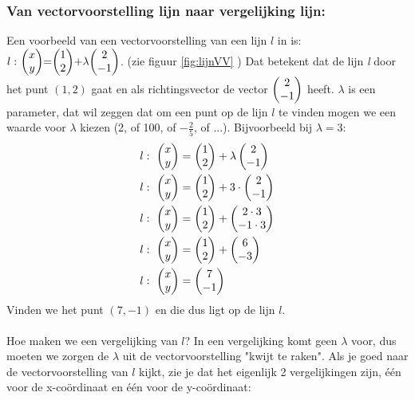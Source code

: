 \subsubsection{Van vectorvoorstelling lijn naar vergelijking lijn:} 
Een voorbeeld van een  vectorvoorstelling van een lijn $ l $ in \RT  is:
$ l: \ \vectwee {x}{y} = \vectwee {1}{2} + \lambda  \vectwee {2}{-1}  $.   (zie figuur \ref{fig:lijnVV} ) Dat betekent dat de lijn\textit{ l} door het punt $ (1,2) $ gaat en als richtingsvector de vector $ \vectwee {2}{-1} $ heeft. $ \lambda $  is een parameter, dat wil zeggen dat om een punt op de lijn $ l $ te vinden mogen we een waarde voor $ \lambda $  kiezen (2, of 100, of $ -\frac{2}{5} $, of ...). Bijvoorbeeld bij  $ \lambda= 3 $: 
\begin{align*}
  l: \ \begin{pmatrix} x \\ y \end{pmatrix} &= \begin{pmatrix} 1 \\ 2 \end{pmatrix}  + \lambda  \begin{pmatrix} 2 \\ -1 \end{pmatrix}  \\
  l: \ \begin{pmatrix} x \\ y \end{pmatrix} &= \begin{pmatrix} 1 \\ 2 \end{pmatrix}  + 3 \cdot \begin{pmatrix} 2 \\ -1 \end{pmatrix}  \\
  l: \ \begin{pmatrix} x \\ y \end{pmatrix} &= \begin{pmatrix} 1 \\ 2 \end{pmatrix}  + \begin{pmatrix} 2\cdot 3 \\ -1\cdot 3 \end{pmatrix}  \\
  l: \ \begin{pmatrix} x \\ y \end{pmatrix} &= \begin{pmatrix} 1 \\ 2 \end{pmatrix}  + \begin{pmatrix} 6 \\ -3 \end{pmatrix}  \\
  l: \ \begin{pmatrix} x \\ y \end{pmatrix} &= \begin{pmatrix} 7 \\ -1 \end{pmatrix}
\end{align*}
Vinden we het punt $(7,-1)$ en die dus ligt op de lijn $ l $. \\ \\

Hoe maken we een vergelijking van  $ l $? In een vergelijking komt geen $ \lambda $ voor, dus moeten we zorgen de $ \lambda $ uit de vectorvoorstelling "kwijt te raken". Als je goed naar de vectorvoorstelling van $ l $ kijkt, zie je dat het eigenlijk 2 vergelijkingen zijn, één voor de x-coördinaat en één voor de y-coördinaat:

